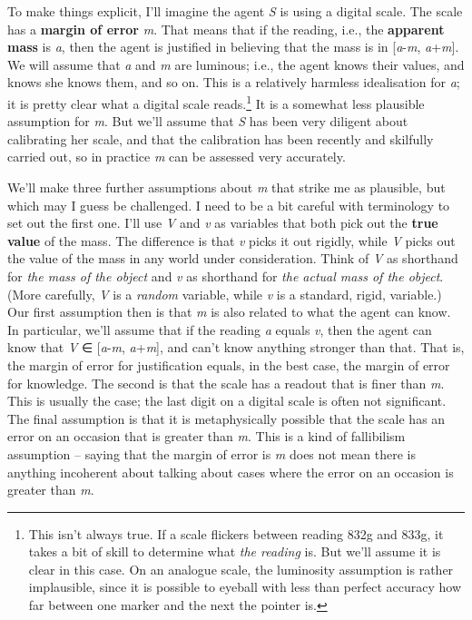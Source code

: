 \documentclass[
  11pt,
  letterpaper,
  DIV=11,
  numbers=noendperiod,
  twoside]{scrartcl}
\begin{document}
To make things explicit, I'll imagine the agent \emph{S} is using a
digital scale. The scale has a \textbf{margin of error} \emph{m}. That
means that if the reading, i.e., the \textbf{apparent mass} is \emph{a},
then the agent is justified in believing that the mass is in
{[}\emph{a}-\emph{m}, \emph{a}+\emph{m}{]}. We will assume that \emph{a}
and \emph{m} are luminous; i.e., the agent knows their values, and knows
she knows them, and so on. This is a relatively harmless idealisation
for \emph{a}; it is pretty clear what a digital scale reads.\footnote{This
  isn't always true. If a scale flickers between reading 832g and 833g,
  it takes a bit of skill to determine what \emph{the reading} is. But
  we'll assume it is clear in this case. On an analogue scale, the
  luminosity assumption is rather implausible, since it is possible to
  eyeball with less than perfect accuracy how far between one marker and
  the next the pointer is.} It is a somewhat less plausible assumption
for \emph{m}. But we'll assume that \emph{S} has been very diligent
about calibrating her scale, and that the calibration has been recently
and skilfully carried out, so in practice \emph{m} can be assessed very
accurately.

We'll make three further assumptions about \emph{m} that strike me as
plausible, but which may I guess be challenged. I need to be a bit
careful with terminology to set out the first one. I'll use \emph{V} and
\emph{v} as variables that both pick out the \textbf{true value} of the
mass. The difference is that \emph{v} picks it out rigidly, while
\emph{V} picks out the value of the mass in any world under
consideration. Think of \emph{V} as shorthand for \emph{the mass of the
object} and \emph{v} as shorthand for \emph{the actual mass of the
object}. (More carefully, \emph{V} is a \emph{random} variable, while
\emph{v} is a standard, rigid, variable.) Our first assumption then is
that \emph{m} is also related to what the agent can know. In particular,
we'll assume that if the reading \emph{a} equals \emph{v}, then the
agent can know that \emph{V} ∈ {[}\emph{a}-\emph{m},
\emph{a}+\emph{m}{]}, and can't know anything stronger than that. That
is, the margin of error for justification equals, in the best case, the
margin of error for knowledge. The second is that the scale has a
readout that is finer than \emph{m}. This is usually the case; the last
digit on a digital scale is often not significant. The final assumption
is that it is metaphysically possible that the scale has an error on an
occasion that is greater than \emph{m}. This is a kind of fallibilism
assumption -- saying that the margin of error is \emph{m} does not mean
there is anything incoherent about talking about cases where the error
on an occasion is greater than \emph{m}.
\end{document}
